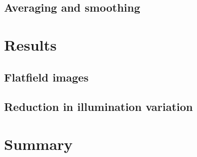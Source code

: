 \documentclass[letterpaper,11pt]{article}
\begin{document}
\subsection{Averaging and smoothing}
\label{ssec:averaging_and_smoothing}

\section{Results}
\label{sec:results}

\subsection{Flatfield images}
\label{ssec:flatfield_images}

\subsection{Reduction in illumination variation}
\label{ssec:reduction_in_illumination_variation}

\section{Summary}
\label{sec:summary}


\end{document}
